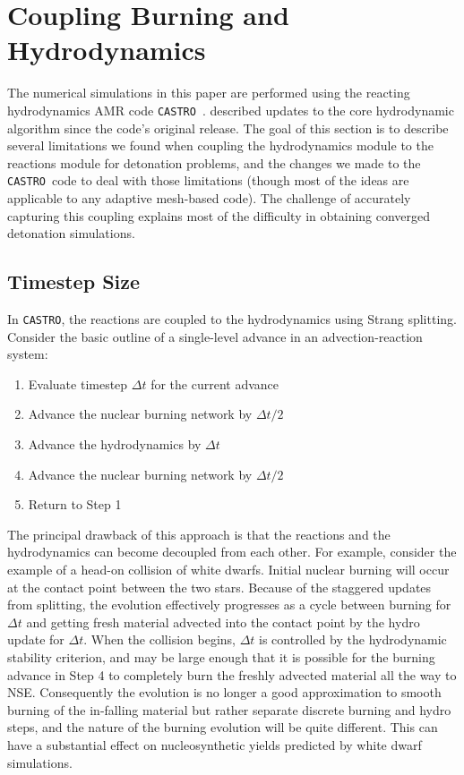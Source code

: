 \documentclass[twocolumn,numberedappendix]{../aastex62}
\newcommand{\castro}{\texttt{CASTRO}}
\begin{document}
\section{Coupling Burning and Hydrodynamics}
\label{sec:hydrocoupling}

The numerical simulations in this paper are performed using the reacting hydrodynamics AMR
code \castro\ \citep{castro}. \cite{wdmergerI} described updates to the core hydrodynamic
algorithm since the code's original release. The goal of this section is to describe several
limitations we found when coupling the hydrodynamics module to the reactions module for detonation
problems, and the changes we made to the \castro\ code to deal with those limitations (though
most of the ideas are applicable to any adaptive mesh-based code). The challenge of accurately
capturing this coupling explains most of the difficulty in obtaining converged detonation
simulations.



\subsection{Timestep Size}
\label{sec:timestep}

In \castro, the reactions are coupled to the hydrodynamics using Strang splitting.
Consider the basic outline of a single-level advance in an advection-reaction system:
\begin{enumerate}
  \item Evaluate timestep $\Delta t$ for the current advance
  \item Advance the nuclear burning network by $\Delta t / 2$
  \item Advance the hydrodynamics by $\Delta t$
  \item Advance the nuclear burning network by $\Delta t / 2$
  \item Return to Step 1
\end{enumerate}
The principal drawback of this approach is that the reactions and the hydrodynamics
can become decoupled from each other. For example, consider the example of a head-on
collision of white dwarfs. Initial nuclear burning will occur at the contact point
between the two stars. Because of the staggered updates from splitting, the evolution
effectively progresses as a cycle between burning for $\Delta t$ and getting fresh
material advected into the contact point by the hydro update for $\Delta t$.
When the collision begins, $\Delta t$ is controlled by the hydrodynamic stability
criterion, and may be large enough that it is possible for the burning advance in
Step 4 to completely burn the freshly advected material all the way to NSE.
Consequently the evolution is no longer a good approximation to smooth burning of
the in-falling material but rather separate discrete burning and hydro steps, and
the nature of the burning evolution will be quite different. This can have a
substantial effect on nucleosynthetic yields predicted by white dwarf simulations.
\end{document}
